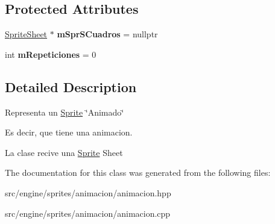 \subsection*{Protected Attributes}
\begin{DoxyCompactItemize}
\item 
\hyperlink{class_sprite_sheet}{Sprite\+Sheet} $\ast$ {\bfseries m\+Spr\+S\+Cuadros} = nullptr\hypertarget{class_animacion_ad9a5ea56a2b3c88f8e5eec0d5c40653c}{}\label{class_animacion_ad9a5ea56a2b3c88f8e5eec0d5c40653c}

\item 
int {\bfseries m\+Repeticiones} = 0\hypertarget{class_animacion_adfac4172f4dea91d1c021744329c120a}{}\label{class_animacion_adfac4172f4dea91d1c021744329c120a}

\end{DoxyCompactItemize}


\subsection{Detailed Description}
Representa un \hyperlink{class_sprite}{Sprite} \char`\"{}\+Animado\char`\"{}

Es decir, que tiene una animacion.

La clase recive una \hyperlink{class_sprite}{Sprite} Sheet 

The documentation for this class was generated from the following files\+:\begin{DoxyCompactItemize}
\item 
src/engine/sprites/animacion/animacion.\+hpp\item 
src/engine/sprites/animacion/animacion.\+cpp\end{DoxyCompactItemize}
